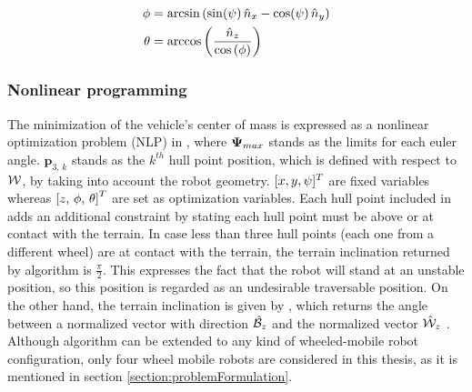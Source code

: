 \begin{equation}
	\begin{aligned}
		\phi &= \arcsin \left( \sin(\psi) \, \hat{n}_x -\cos(\psi)\, \hat{n}_y \right) \\
		\theta &= \arccos \left( \frac{\hat{n}_z}{\cos\left( \phi \right)} \right) \\
	\end{aligned}	
	\label{eq:rollPitchInitialGuess}
\end{equation}

\subsubsection*{Nonlinear programming}

The minimization of the vehicle's center of mass is expressed as a nonlinear optimization problem (NLP) in , where $\boldsymbol{\Psi}_{max}$ stands as the limits for each euler angle. $\mathbf{p}_{3,\,k}$ stands as the $k^{th}$ hull point position, which is defined with respect to $\mathcal{W}$, by taking into account the robot geometry. $[x, y, \psi]^T$ are fixed variables whereas $\left[ {z},\, {\phi},\, {\theta}\right]^T$ are set as optimization variables. Each hull point included in  adds an additional constraint by stating each hull point must be above or at contact with the terrain. In case less than three hull points (each one from a different wheel) are at contact with the terrain, the terrain inclination returned by algorithm  is $\frac{\pi}{2}$. This expresses the fact that the robot will stand at an unstable position, so this position is regarded as an undesirable traversable position.  On the other hand, the terrain inclination is given by , which returns the angle between a normalized vector with direction $\hat{\mathcal{B}}_z$ and the normalized vector $\hat{\mathcal{W}}_z$ \cite{Amorim2014}. Although algorithm  can be extended to any kind of wheeled-mobile robot configuration, only four wheel mobile robots are considered in this thesis, as it is mentioned in section \ref{section:problemFormulation}.

